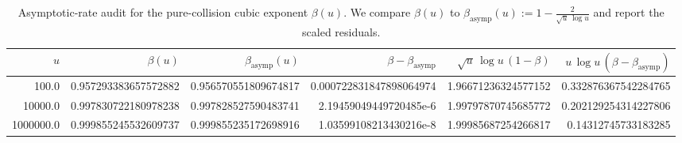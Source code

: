 \begin{table}[H]
\centering
\scriptsize
\setlength{\tabcolsep}{5pt}
\caption{Asymptotic-rate audit for the pure-collision cubic exponent $\beta(u)$. We compare $\beta(u)$ to $\beta_{\mathrm{asymp}}(u):=1-\frac{2}{\sqrt u\,\log u}$ and report the scaled residuals.}
\label{tab:arity_pure_collision_cubic_beta_asymptotic_rate}
\begin{tabular}{r r r r r r}
\toprule
$u$ & $\beta(u)$ & $\beta_{\mathrm{asymp}}(u)$ & $\beta-\beta_{\mathrm{asymp}}$ & $\sqrt u\,\log u\,(1-\beta)$ & $u\,\log u\,(\beta-\beta_{\mathrm{asymp}})$\\
\midrule
100.0 & 0.957293383657572882 & 0.956570551809674817 & 0.000722831847898064974 & 1.96671236324577152 & 0.332876367542284765\\
10000.0 & 0.997830722180978238 & 0.997828527590483741 & 2.19459049449720485e-6 & 1.99797870745685772 & 0.202129254314227806\\
1000000.0 & 0.999855245532609737 & 0.999855235172698916 & 1.03599108213430216e-8 & 1.99985687254266817 & 0.14312745733183285\\
\bottomrule
\end{tabular}
\end{table}
